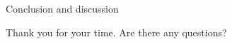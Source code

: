 \begin{frame}{Conclusion and discussion}

Thank you for your time. Are there any questions?

\end{frame}
